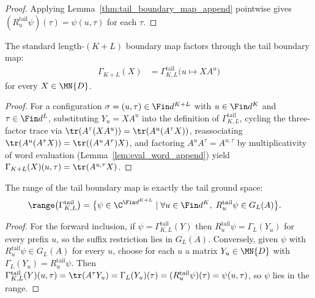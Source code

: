 \begin{proof}
    \leanok
    Applying Lemma~\ref{thm:tail_boundary_map_append} pointwise gives
    $(R^{\mathrm{tail}}_u\psi)(\tau)=\psi(u,\tau)$ for each $\tau$.
\end{proof}

\begin{lemma}\label{thm:tail_boundary_map_factorization}
    \leanok
    The standard length-$(K+L)$ boundary map factors through the tail boundary map:
    \begin{align}
        \Gamma_{K+L}(X)
         & =\Gamma^{\mathrm{tail}}_{K,L}\bigl(u\mapsto X A^{u}\bigr)
    \end{align}
    for every $X\in\MN{D}$.
\end{lemma}

\begin{proof}
    \leanok
    For a configuration $\sigma=(u,\tau)\in\Fin d^{K+L}$ with
    $u\in\Fin d^K$ and $\tau\in\Fin d^L$, substituting $Y_u=X A^u$ into the
    definition of $\Gamma^{\mathrm{tail}}_{K,L}$, cycling the three-factor
    trace via $\tr(A^\tau(X A^u))=\tr(A^u(A^\tau X))$, reassociating
    $\tr(A^u(A^\tau X))=\tr((A^u A^\tau)X)$, and factoring $A^u A^\tau=A^{u,\tau}$
    by multiplicativity of word evaluation (Lemma~\ref{lem:eval_word_append})
    yield $\Gamma_{K+L}(X)(u,\tau)=\tr(A^{u,\tau}X)$.
\end{proof}

\begin{lemma}\label{thm:tail_boundary_map_range_eq}
    \leanok
    The range of the tail boundary map is exactly the tail ground space:
    \begin{align}
        \range\bigl(\Gamma^{\mathrm{tail}}_{K,L}\bigr)
         & =\bigl\{\psi\in\C^{\Fin d^{K+L}}
        \mid \forall u\in\Fin d^K,\;
        R^{\mathrm{tail}}_u\psi\in G_L(A)\bigr\}.
    \end{align}
\end{lemma}

\begin{proof}
    \leanok
    For the forward inclusion, if $\psi=\Gamma^{\mathrm{tail}}_{K,L}(Y)$ then
    $R^{\mathrm{tail}}_u\psi=\Gamma_L(Y_u)$ for every prefix $u$, so the suffix
    restriction lies in $G_L(A)$.
    Conversely, given $\psi$ with $R^{\mathrm{tail}}_u\psi\in G_L(A)$ for every $u$,
    choose for each $u$ a matrix $Y_u\in\MN{D}$ with
    $\Gamma_L(Y_u)=R^{\mathrm{tail}}_u\psi$.  Then
    $\Gamma^{\mathrm{tail}}_{K,L}(Y)(u,\tau)=\tr(A^\tau Y_u)
        =\Gamma_L(Y_u)(\tau)=(R^{\mathrm{tail}}_u\psi)(\tau)=\psi(u,\tau)$,
    so $\psi$ lies in the range.
\end{proof}

